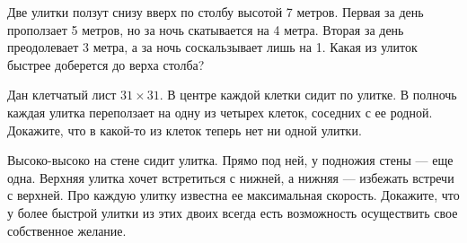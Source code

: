 ﻿
\begin{itemize}

\itA Две улитки ползут снизу вверх по столбу высотой 7 метров. Первая за день проползает 5 метров, но за ночь скатывается на 4 метра. Вторая за день преодолевает 3 метра, а за ночь соскальзывает лишь на 1. Какая из улиток быстрее доберется до верха столба?

\itB Дан клетчатый лист $31 \times 31$. В центре каждой клетки сидит по улитке. В полночь каждая улитка переползает на одну из четырех клеток, соседних с ее родной. Докажите, что в какой-то из клеток теперь нет ни одной улитки.

\itC Высоко-высоко на стене сидит улитка. Прямо под ней, у подножия стены — еще одна. Верхняя улитка хочет встретиться с нижней, а нижняя — избежать встречи с верхней. Про каждую улитку известна ее максимальная скорость. Докажите, что у более быстрой улитки из этих двоих всегда есть возможность осуществить свое собственное желание.
\end{itemize}